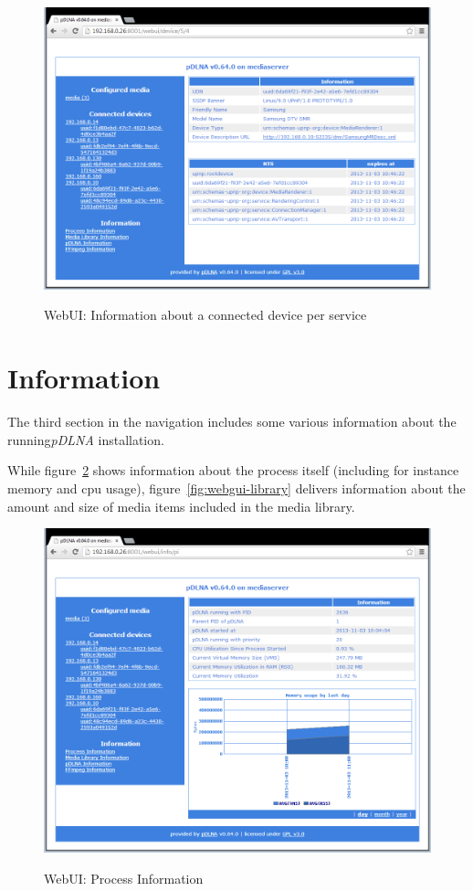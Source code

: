 \documentclass[a4paper,oneside,10pt]{report}
\begin{document}
\begin{figure}
	\centering
		\includegraphics[width=34em]{images/webui_device_ip_service}
	\label{fig:webgui-connecteddevice-service}
	\caption{WebUI: Information about a connected device per service}
\end{figure}

\section{Information}

The third section in the navigation includes some various information about the running{\em pDLNA} installation.

While figure~\ref{fig:webgui-process} shows information about the process itself (including for instance memory and cpu usage), figure~\ref{fig:webgui-library} delivers information about the amount and size of media items included in the media library.

\begin{figure}
	\centering
		\includegraphics[width=34em]{images/webui_info_process}
	\label{fig:webgui-process}
	\caption{WebUI: Process Information}
\end{figure}
\end{document}
